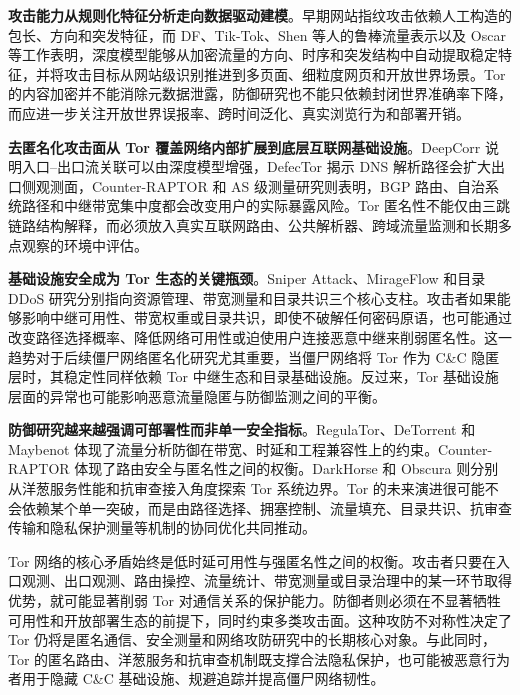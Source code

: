 \textbf{攻击能力从规则化特征分析走向数据驱动建模}。早期网站指纹攻击依赖人工构造的包长、方向和突发特征，而 DF、Tik-Tok、Shen 等人的鲁棒流量表示以及 Oscar 等工作表明，深度模型能够从加密流量的方向、时序和突发结构中自动提取稳定特征，并将攻击目标从网站级识别推进到多页面、细粒度网页和开放世界场景\cite{sirinam2018deep,rahman2019tik,shen2023subverting,zhao2024towards}。Tor 的内容加密并不能消除元数据泄露，防御研究也不能只依赖封闭世界准确率下降，而应进一步关注开放世界误报率、跨时间泛化、真实浏览行为和部署开销。

\textbf{去匿名化攻击面从 Tor 覆盖网络内部扩展到底层互联网基础设施}。DeepCorr 说明入口--出口流关联可以由深度模型增强\cite{nasr2018deepcorr}，DefecTor 揭示 DNS 解析路径会扩大出口侧观测面\cite{greschbach2016effect}，Counter-RAPTOR 和 AS 级测量研究则表明，BGP 路由、自治系统路径和中继带宽集中度都会改变用户的实际暴露风险\cite{sun2017counter,gegenhuber2023extended}。Tor 匿名性不能仅由三跳链路结构解释，而必须放入真实互联网路由、公共解析器、跨域流量监测和长期多点观察的环境中评估。

\textbf{基础设施安全成为 Tor 生态的关键瓶颈}。Sniper Attack、MirageFlow 和目录 DDoS 研究分别指向资源管理、带宽测量和目录共识三个核心支柱\cite{jansen2014sniper,sendner2024mirageflow,luo2026five}。攻击者如果能够影响中继可用性、带宽权重或目录共识，即使不破解任何密码原语，也可能通过改变路径选择概率、降低网络可用性或迫使用户连接恶意中继来削弱匿名性。这一趋势对于后续僵尸网络匿名化研究尤其重要，当僵尸网络将 Tor 作为 C\&C 隐匿层时，其稳定性同样依赖 Tor 中继生态和目录基础设施。反过来，Tor 基础设施层面的异常也可能影响恶意流量隐匿与防御监测之间的平衡。

\textbf{防御研究越来越强调可部署性而非单一安全指标}。RegulaTor、DeTorrent 和 Maybenot 体现了流量分析防御在带宽、时延和工程兼容性上的约束\cite{holland2020regulator,holland2023detorrent,pulls2023maybenot}。Counter-RAPTOR 体现了路由安全与匿名性之间的权衡\cite{sun2017counter}。DarkHorse 和 Obscura 则分别从洋葱服务性能和抗审查接入角度探索 Tor 系统边界\cite{al2023darkhorse,vilalonga2026obscura}。Tor 的未来演进很可能不会依赖某个单一突破，而是由路径选择、拥塞控制、流量填充、目录共识、抗审查传输和隐私保护测量等机制的协同优化共同推动。

Tor 网络的核心矛盾始终是低时延可用性与强匿名性之间的权衡。攻击者只要在入口观测、出口观测、路由操控、流量统计、带宽测量或目录治理中的某一环节取得优势，就可能显著削弱 Tor 对通信关系的保护能力。防御者则必须在不显著牺牲可用性和开放部署生态的前提下，同时约束多类攻击面。这种攻防不对称性决定了 Tor 仍将是匿名通信、安全测量和网络攻防研究中的长期核心对象。与此同时，Tor 的匿名路由、洋葱服务和抗审查机制既支撑合法隐私保护，也可能被恶意行为者用于隐藏 C\&C 基础设施、规避追踪并提高僵尸网络韧性。
